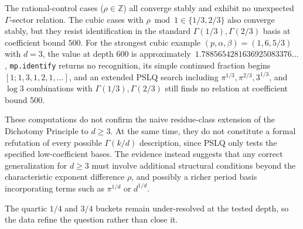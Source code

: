 The rational-control cases ($\rho \in \mathbb{Z}$) all converge stably and exhibit no unexpected $\Gamma$-sector relation. The cubic cases with $\rho \bmod 1 \in \{1/3,2/3\}$ also converge stably, but they resist identification in the standard $\Gamma(1/3),\Gamma(2/3)$ basis at coefficient bound $500$.
For the strongest cubic example $(p,\alpha,\beta)=(1,6,5/3)$ with $d=3$, the value at depth $600$ is approximately $\,1.7885654281636925083376\ldots$, \texttt{mp.identify} returns no recognition, its simple continued fraction begins $[1; 1, 3, 1, 2, 1, \ldots]$, and an extended PSLQ search including $\pi^{1/3}, \pi^{2/3}, 3^{1/3}$, and $\log 3$ combinations with $\Gamma(1/3),\Gamma(2/3)$ still finds no relation at coefficient bound 500.

\begin{remark}\label{rem:d34-open}
These computations do not confirm the naive residue-class extension of the Dichotomy Principle to $d \geq 3$. At the same time, they do not constitute a formal refutation of every possible $\Gamma(k/d)$ description, since PSLQ only tests the specified low-coefficient bases.
The evidence instead suggests that any correct generalization for $d \geq 3$ must involve additional structural conditions beyond the characteristic exponent difference $\rho$, and possibly a richer period basis incorporating terms such as $\pi^{1/d}$ or $d^{1/d}$.
\end{remark}

The quartic $1/4$ and $3/4$ buckets remain under-resolved at the tested depth, so the data refine the question rather than close it.

